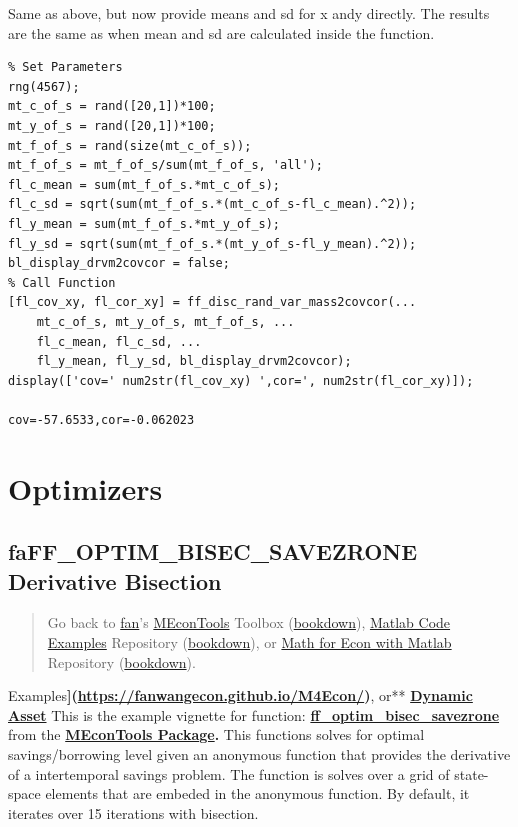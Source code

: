 \documentclass[
]{book}
\begin{document}
Same as above, but now provide means and sd for x andy directly. The
results are the same as when mean and sd are calculated inside the
function.

\begin{verbatim}
% Set Parameters
rng(4567);
mt_c_of_s = rand([20,1])*100;
mt_y_of_s = rand([20,1])*100;
mt_f_of_s = rand(size(mt_c_of_s));
mt_f_of_s = mt_f_of_s/sum(mt_f_of_s, 'all');
fl_c_mean = sum(mt_f_of_s.*mt_c_of_s);
fl_c_sd = sqrt(sum(mt_f_of_s.*(mt_c_of_s-fl_c_mean).^2));
fl_y_mean = sum(mt_f_of_s.*mt_y_of_s);
fl_y_sd = sqrt(sum(mt_f_of_s.*(mt_y_of_s-fl_y_mean).^2));
bl_display_drvm2covcor = false;
% Call Function
[fl_cov_xy, fl_cor_xy] = ff_disc_rand_var_mass2covcor(...
    mt_c_of_s, mt_y_of_s, mt_f_of_s, ...
    fl_c_mean, fl_c_sd, ...
    fl_y_mean, fl_y_sd, bl_display_drvm2covcor);
display(['cov=' num2str(fl_cov_xy) ',cor=', num2str(fl_cor_xy)]);

cov=-57.6533,cor=-0.062023
\end{verbatim}

\hypertarget{optimizers}{%
\chapter{Optimizers}\label{optimizers}}

\hypertarget{faff_optim_bisec_savezrone-derivative-bisection}{%
\section{faFF\_OPTIM\_BISEC\_SAVEZRONE Derivative Bisection}\label{faff_optim_bisec_savezrone-derivative-bisection}}

\begin{quote}
Go back to \href{http://fanwangecon.github.io/}{fan}'s \href{https://fanwangecon.github.io/MEconTools/}{MEconTools} Toolbox (\href{https://fanwangecon.github.io/MEconTools/bookdown}{bookdown}), \href{https://fanwangecon.github.io/M4Econ/}{Matlab Code Examples} Repository (\href{https://fanwangecon.github.io/M4Econ/bookdown}{bookdown}), or \href{https://fanwangecon.github.io/Math4Econ/}{Math for Econ with Matlab} Repository (\href{https://fanwangecon.github.io/Math4Econ/bookdown}{bookdown}).
\end{quote}

Examples\textbf{{]}(\url{https://fanwangecon.github.io/M4Econ/})}, or** \href{https://fanwangecon.github.io/CodeDynaAsset/}{\textbf{Dynamic
Asset}}
This is the example vignette for function:
\href{https://github.com/FanWangEcon//MEconTools/blob/master/MEconTools/optim/ff_optim_bisec_savezrone.m}{\textbf{ff\_optim\_bisec\_savezrone}}
from the \href{https://fanwangecon.github.io/MEconTools/}{\textbf{MEconTools
Package}}\textbf{.} This
functions solves for optimal savings/borrowing level given an anonymous
function that provides the derivative of a intertemporal savings
problem. The function is solves over a grid of state-space elements that
are embeded in the anonymous function. By default, it iterates over 15
iterations with bisection.
\end{document}
